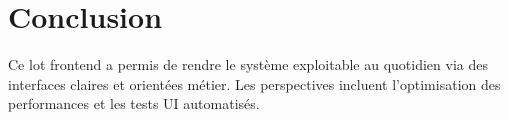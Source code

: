 \chapter*{Conclusion}

Ce lot frontend a permis de rendre le système exploitable au quotidien via des interfaces claires et orientées métier. Les perspectives incluent l'optimisation des performances et les tests UI automatisés.

